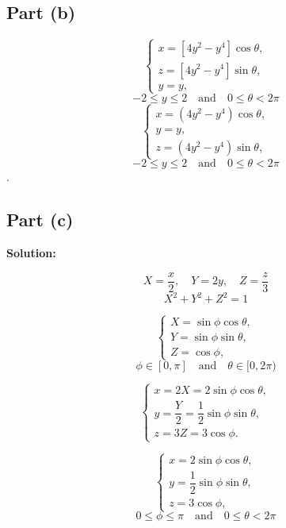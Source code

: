\documentclass{report}
\begin{document}
\subsection*{Part (b)}
    \[ \begin{cases}
    x = [4y^2 - y^4] \cos\theta, \\
    z = [4y^2 - y^4] \sin\theta, \\
    y = y, \end{cases} \]
    \[ -2 \leq y \leq 2 \quad \text{and}  \quad 0 \leq \theta < 2\pi \] 
    \[ \begin{cases}
    x = \left(4y^2 - y^4\right) \cos\theta, \\
    y = y, \\
    z = \left(4y^2 - y^4\right) \sin\theta,
    \end{cases} \]
    \[ -2 \leq y \leq 2 \quad \text{and} \quad 0 \leq \theta < 2\pi \].


\subsection*{Part (c)}

\textbf{Solution:}

    \[ X = \dfrac{x}{2}, \quad Y = 2y, \quad Z = \dfrac{z}{3} \]
    \[ X^2 + Y^2 + Z^2 = 1 \]

    \[ \begin{cases}
    X = \sin\phi \cos\theta, \\
    Y = \sin\phi \sin\theta, \\
    Z = \cos\phi,
    \end{cases} \]
    \[ \phi \in [0, \pi] \quad \text{and} \quad  \theta \in [0, 2\pi) \]

    \[ \begin{cases}
    x = 2X = 2\sin\phi \cos\theta, \\
    y = \dfrac{Y}{2} = \dfrac{1}{2}\sin\phi \sin\theta, \\
    z = 3Z = 3\cos\phi.
    \end{cases} \]

    \[
    \begin{cases}
    x = 2 \sin\phi \cos\theta, \\
    y = \dfrac{1}{2} \sin\phi \sin\theta, \\
    z = 3 \cos\phi,
    \end{cases} \]
    \[ 0 \leq \phi \leq \pi \quad \text{and} \quad 0 \leq \theta < 2\pi \] 



\end{document}
